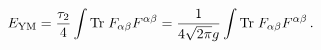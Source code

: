 \begin{equation}
E_{{\rm YM}} = \frac{\tau_2}{4}  \int {\rm Tr}\; F_{\alpha \beta}
F^{\alpha \beta} = \frac{1}{4 \sqrt{2 \pi} g}  \int {\rm Tr}\;
F_{\alpha \beta}
F^{\alpha \beta}\,.
\end{equation}

